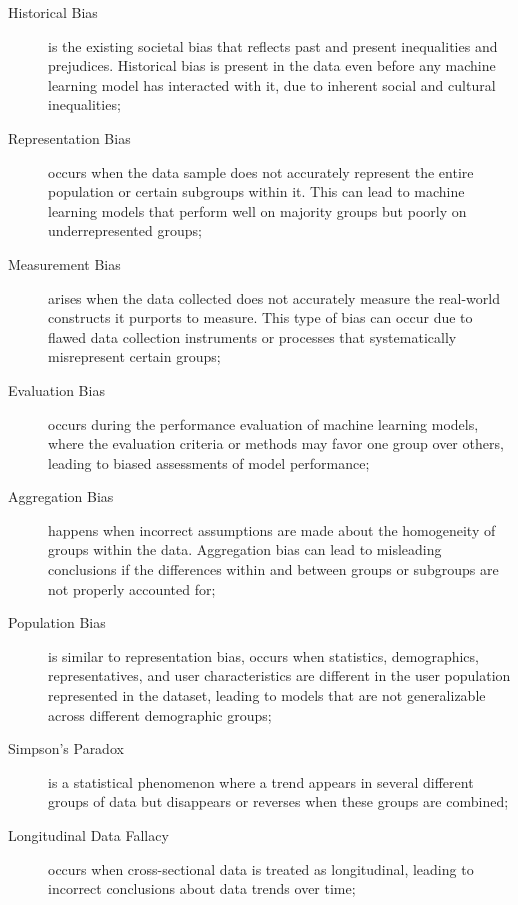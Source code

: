 \begin{description}
    \item[Historical Bias] is the existing societal bias that reflects past and present inequalities and prejudices. Historical bias is present in the data even before any machine learning model has interacted with it, due to inherent social and cultural inequalities;
    
    \item[Representation Bias] occurs when the data sample does not accurately represent the entire population or certain subgroups within it. This can lead to machine learning models that perform well on majority groups but poorly on underrepresented groups;

    \item[Measurement Bias] arises when the data collected does not accurately measure the real-world constructs it purports to measure. This type of bias can occur due to flawed data collection instruments or processes that systematically misrepresent certain groups;
    
    \item[Evaluation Bias] occurs during the performance evaluation of machine learning models, where the evaluation criteria or methods may favor one group over others, leading to biased assessments of model performance;

    \item[Aggregation Bias] happens when incorrect assumptions are made about the homogeneity of groups within the data. Aggregation bias can lead to misleading conclusions if the differences within and between groups or subgroups are not properly accounted for;
    
    \item[Population Bias] is similar to representation bias, occurs when statistics, demographics, representatives, and user characteristics are different in the user population represented in the dataset, leading to models that are not generalizable across different demographic groups;

    \item[Simpson’s Paradox] is a statistical phenomenon where a trend appears in several different groups of data but disappears or reverses when these groups are combined;

    \item[Longitudinal Data Fallacy] occurs when cross-sectional data is treated as longitudinal, leading to incorrect conclusions about data trends over time;


\end{description}

